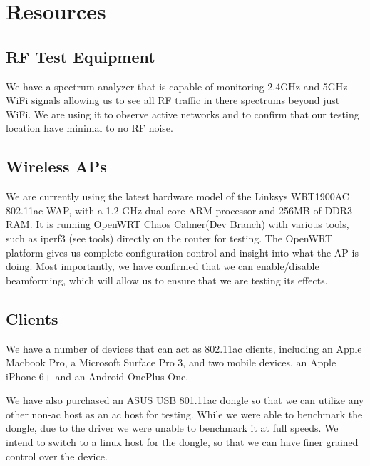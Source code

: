 \section{Resources}

\subsection{RF Test Equipment}

We have a spectrum analyzer that is capable of monitoring 2.4GHz and 5GHz WiFi signals 
allowing us to see all RF traffic in there spectrums beyond just WiFi. We are using it to observe
active networks and to confirm that our testing location have minimal to no RF noise.

\subsection{Wireless APs}

We are currently using the latest hardware model of the Linksys WRT1900AC 802.11ac WAP, with a 1.2 GHz dual core ARM
processor and 256MB of DDR3 RAM. It is running OpenWRT Chaos Calmer(Dev Branch) with various tools, such as iperf3 (see tools) 
directly on the router for testing. The OpenWRT platform gives us complete configuration control
and insight into what the AP is doing. Most importantly, we have confirmed that we can enable/disable beamforming, which will
allow us to ensure that we are testing its effects.

\subsection{Clients}

We have a number of devices that can act as
802.11ac clients, including an Apple Macbook Pro, a Microsoft Surface Pro 3,
and two mobile devices, an Apple iPhone 6+ and an Android OnePlus
One.

We have also purchased an ASUS USB 801.11ac dongle so that we can
utilize any other non-ac host as an ac host for testing. While we were
able to benchmark the dongle, due to the driver we were unable to
benchmark it at full speeds. We intend to switch to a linux host for
the dongle, so that we can have finer grained control over the device.
